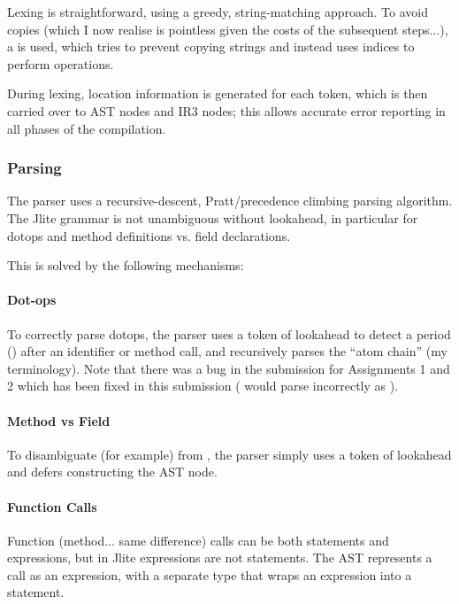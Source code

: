 \documentclass[12pt]{article}
\begin{document}
Lexing is straightforward, using a greedy, string-matching approach. To avoid copies (which I now realise
is pointless given the costs of the subsequent steps...), a  is used, which tries to prevent
copying strings and instead uses indices to perform operations.

During lexing, location information is generated for each token, which is then carried over to AST nodes and IR3 nodes;
this allows accurate error reporting in all phases of the compilation.



\subsubsection{Parsing}

The parser uses a recursive-descent, Pratt/precedence climbing parsing algorithm. The Jlite grammar is not unambiguous
without lookahead, in particular for dotops and method definitions vs. field declarations.

This is solved by the following mechanisms:

\paragraph{Dot-ops}

To correctly parse dotops, the parser uses a token of lookahead to detect a period () after an identifier
or method call, and recursively parses the \enquote{atom chain} (my terminology). Note that there was a bug in
the submission for Assignments 1 and 2 which has been fixed in this submission ( would parse
incorrectly as ).

\paragraph{Method vs Field}

To disambiguate (for example)  from , the parser simply uses a token of lookahead
and defers constructing the AST node.

\paragraph{Function Calls}

Function (method... same difference) calls can be both statements and expressions, but in Jlite expressions are
not statements. The AST represents a call as an expression, with a separate  type that wraps an
expression into a statement.
\end{document}
